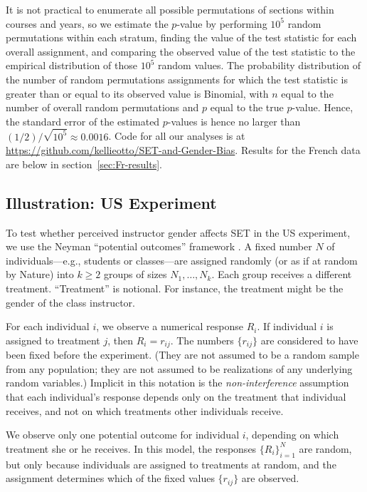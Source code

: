 \documentclass[12pt]{article}
\begin{document}
It is not practical to enumerate all possible permutations of sections within courses
and years, so we estimate the $p$-value by performing $10^5$ 
random permutations within each stratum, finding the value of the test statistic for each
overall assignment, and comparing the observed value of the test statistic to the 
empirical distribution of those $10^5$ random values.
The probability distribution of the number of random permutations assignments for 
which the test statistic is greater than or equal to its observed value is Binomial, with 
$n$ equal to the number of overall
random permutations and $p$ equal to the true $p$-value.
Hence, the standard error of the estimated $p$-values is hence no larger than 
$(1/2)/ \sqrt{10^5}
\approx 0.0016$.
Code for all our analyses is at 
\url{https://github.com/kellieotto/SET-and-Gender-Bias}.
Results for the French data are below in section~\ref{sec:Fr-results}.

\subsection{Illustration: US Experiment}
To test whether perceived instructor gender affects SET in the US experiment,
we use the Neyman ``potential outcomes'' framework \citep{Neyman1923}.
A fixed number $N$ of individuals---e.g., students or classes---are assigned
randomly (or as if at random by Nature) into 
$k \ge 2$ groups of sizes $N_1, \ldots, N_k$.
Each group receives a different treatment.
``Treatment'' is notional. 
For instance, the treatment might be the gender of the
class instructor.

For each individual $i$, we observe a numerical response $R_i$.
If individual $i$ is assigned to treatment $j$, then $R_i = r_{ij}$.
The numbers $\{r_{ij}\}$ are considered to have been fixed before the experiment.
(They are not assumed to be a random sample from any population;
they are not assumed to be realizations of any underlying random variables.)
Implicit in this notation is the \emph{non-interference} assumption that
each individual's response depends only on the treatment that individual receives, 
and not on which treatments other individuals receive.

We observe only one potential outcome for individual $i$, 
depending on which treatment she or he receives.
In this model, the responses $\{R_i\}_{i=1}^N$ are random, but only because 
individuals are assigned to treatments at random, and the
assignment determines which of the fixed values $\{r_{ij}\}$ are observed.
\end{document}
